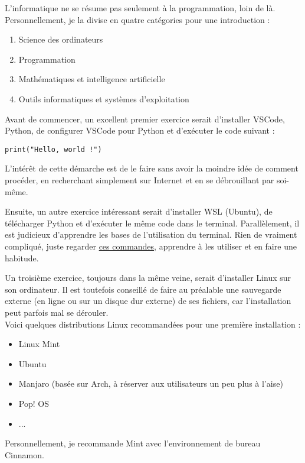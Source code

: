 \documentclass[12pt]{article}
\begin{document}
L'informatique ne se résume pas seulement à la programmation, loin de là. \\
Personnellement, je la divise en quatre catégories pour une introduction : \\
\begin{enumerate}
\item Science des ordinateurs
\item Programmation
\item Mathématiques et intelligence artificielle
\item Outils informatiques et systèmes d'exploitation
\end{enumerate}

Avant de commencer, un excellent premier exercice serait d'installer VSCode,
Python, de configurer VSCode pour Python et d'exécuter le code suivant :
\begin{verbatim}
print("Hello, world !")
\end{verbatim}
L'intérêt de cette démarche est de le faire sans avoir la moindre idée de comment procéder,
en recherchant simplement sur Internet et en se débrouillant par soi-même.

Ensuite, un autre exercice intéressant serait d'installer WSL (Ubuntu),
de télécharger Python et d'exécuter le même code dans le terminal.
Parallèlement, il est judicieux d'apprendre les bases de l'utilisation du terminal.
Rien de vraiment compliqué, juste regarder \href{https://kinsta.com/blog/linux-commands/}{ces commandes}, apprendre à les utiliser et
en faire une habitude.

Un troisième exercice, toujours dans la même veine, serait d'installer Linux sur son ordinateur.
Il est toutefois conseillé de faire au préalable une sauvegarde externe (en ligne ou sur un disque dur externe) de
ses fichiers, car l'installation peut parfois mal se dérouler.\\
Voici quelques distributions Linux recommandées pour une première installation :
\begin{itemize}
\item Linux Mint
\item Ubuntu
\item Manjaro (basée sur Arch, à réserver aux utilisateurs un peu plus à l'aise)
\item Pop! OS
\item ... 
\end{itemize}
Personnellement, je recommande Mint avec l'environnement de bureau Cinnamon.\\
\end{document}
